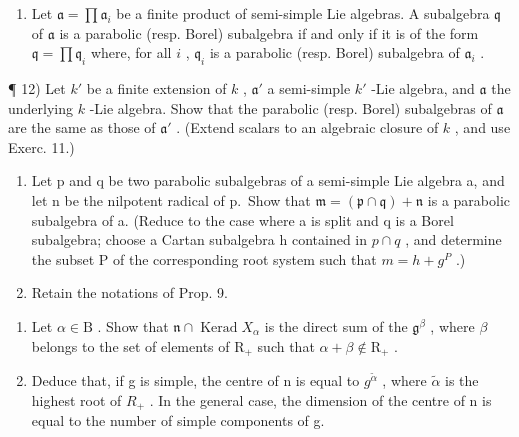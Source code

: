 \begin{enumerate}
\def\labelenumi{\arabic{enumi})}
\setcounter{enumi}{10}
\tightlist
\item
  Let \(\mathfrak{a} = \prod \mathfrak{a}_i\) be a finite product of semi-simple Lie algebras. A subalgebra \(\mathfrak{q}\) of \(\mathfrak{a}\) is a parabolic (resp. Borel) subalgebra if and only if it is of the form \(\mathfrak{q} = \prod \mathfrak{q}_i\) where, for all \(i\) , \(\mathfrak{q}_i\) is a parabolic (resp. Borel) subalgebra of \(\mathfrak{a}_i\) .
\end{enumerate}

¶ 12) Let \(k'\) be a finite extension of \(k\) , \(\mathfrak{a}'\) a semi-simple \(k'\) -Lie algebra, and \(\mathfrak{a}\) the underlying \(k\) -Lie algebra. Show that the parabolic (resp. Borel) subalgebras of \(\mathfrak{a}\) are the same as those of \(\mathfrak{a}'\) . (Extend scalars to an algebraic closure of \(k\) , and use Exerc. 11.)

\begin{enumerate}
\def\labelenumi{\arabic{enumi})}
\setcounter{enumi}{12}
\item
  Let p and q be two parabolic subalgebras of a semi-simple Lie algebra a, and let n be the nilpotent radical of p.~Show that \(\mathfrak{m} = (\mathfrak{p} \cap \mathfrak{q}) + \mathfrak{n}\) is a parabolic subalgebra of a. (Reduce to the case where a is split and q is a Borel subalgebra; choose a Cartan subalgebra h contained in \(p \cap q\) , and determine the subset P of the corresponding root system such that \(m = h + g^{P}\) .)
\item
  Retain the notations of Prop. 9.
\end{enumerate}

\begin{enumerate}
\def\labelenumi{\alph{enumi})}
\item
  Let \(\alpha \in \mathrm{B}\) . Show that \(\mathfrak{n} \cap \operatorname{Kerad} X_{\alpha}\) is the direct sum of the \(\mathfrak{g}^{\beta}\) , where \(\beta\) belongs to the set of elements of \(\mathrm{R}_{+}\) such that \(\alpha + \beta \notin \mathrm{R}_{+}\) .
\item
  Deduce that, if g is simple, the centre of n is equal to \(g^{\tilde{\alpha}}\) , where \(\tilde{\alpha}\) is the highest root of \(R_{+}\) . In the general case, the dimension of the centre of n is equal to the number of simple components of g.
\end{enumerate}